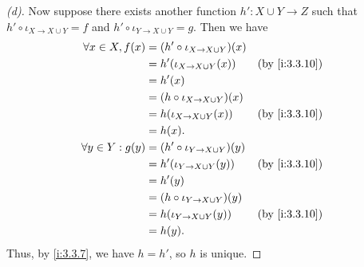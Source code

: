 \begin{proof}[(d)]
  Now suppose there exists another function \(h' : X \cup Y \to Z\) such that \(h' \circ \iota_{X \to X \cup Y} = f\) and \(h' \circ \iota_{Y \to X \cup Y} = g\).
  Then we have
  \begin{align*}
    \forall x \in X, f(x)  & = (h' \circ \iota_{X \to X \cup Y})(x)                    \\
                           & = h'(\iota_{X \to X \cup Y}(x))        &  & \by{i:3.3.10} \\
                           & = h'(x)                                                   \\
                           & = (h \circ \iota_{X \to X \cup Y})(x)                     \\
                           & = h(\iota_{X \to X \cup Y}(x))         &  & \by{i:3.3.10} \\
                           & = h(x).                                                   \\
    \forall y \in Y : g(y) & = (h' \circ \iota_{Y \to X \cup Y})(y)                    \\
                           & = h'(\iota_{Y \to X \cup Y}(y))        &  & \by{i:3.3.10} \\
                           & = h'(y)                                                   \\
                           & = (h \circ \iota_{Y \to X \cup Y})(y)                     \\
                           & = h(\iota_{Y \to X \cup Y}(y))         &  & \by{i:3.3.10} \\
                           & = h(y).
  \end{align*}
  Thus, by \cref{i:3.3.7}, we have \(h = h'\), so \(h\) is unique.
\end{proof}
